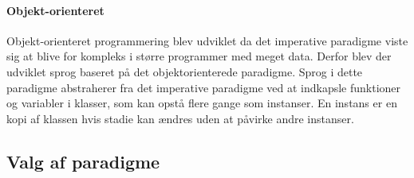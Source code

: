 \paragraph{Objekt-orienteret}
Objekt-orienteret programmering blev udviklet da det imperative paradigme viste sig at blive for kompleks i større programmer med meget data. Derfor blev der udviklet sprog baseret på det objektorienterede paradigme. Sprog i dette paradigme abstraherer fra det imperative paradigme ved at indkapsle funktioner og variabler i klasser, som kan opstå flere gange som instanser. En instans er en kopi af klassen hvis stadie kan ændres uden at påvirke andre instanser.

\subsection{Valg af paradigme}\label{ssec:paradigmevalg}

